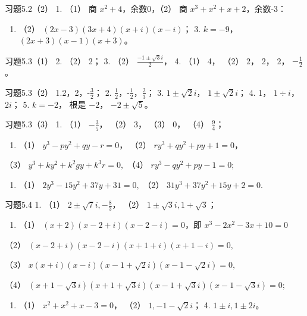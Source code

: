 习题5.2（2） 1. （1） 商 \(x^{2} + 4\)，余数0，（2） 商
\(x^{3} + x^{2} + x + 2\)，余数-3：

\begin{enumerate}[start=2]
\item
  （2） \((2x - 3)(3x + 4)(x + i)(x - i)\)； 3. \(k = -9\)，
  \((2x + 3)(x - 1)(x + 3)\)。
\end{enumerate}

习题5.3（1） 2. （2） 2； 3. （2） \(\frac{-1 \pm \sqrt{3} i}{2}\)， 4.
（1） 4， （2） 2， 2， 2， \(-\frac{1}{2}\)。

习题5.3（2） 1.2，2，-\(\frac{3}{2}\)； 2.
\(\frac{1}{2}\)，-\(\frac{1}{2}\)，\(\frac{2}{3}\)； 3.
\(1 \pm \sqrt{2} i\)， \(1 \pm \sqrt{2} i\)； 4. 1， \(1 \div i\)，
\(2i\)； 5. \(k = -2\)， 根是 \(-2\)， \(-2 \pm \sqrt{5}\)。

习题5.3（3） 1. （1） \(-\frac{3}{5}\)， （2） 3， （3） 0， （4）
\(\frac{9}{4}\)；

\begin{enumerate}[start=2]
\item
  （1） \(y^{3} - py^{2} + qy - r = 0\)， （2）
  \(ry^{3} + qy^{2} + py + 1 = 0\)，
\end{enumerate}

（3） \(y^{3} + ky^{2} + k^{2}gy + k^{3}r = 0,\) （4）
\(ry^{3} - qy^{2} + py - 1 = 0;\)

\begin{enumerate}[start=3]
\item
  （1） \(2y^{3} - 15y^{2} + 37y + 31 = 0,\) （2）
  \(31y^{3} + 37y^{2} + 15y + 2 = 0.\)
\end{enumerate}

习题5.4 1. （1） \(2 \pm \sqrt{7} i, -\frac{8}{3}\)， （2）
\(1 \pm \sqrt{3} i, 1 + \sqrt{3}\)；

\begin{enumerate}[start=2]
\item
  （1） \((x + 2)(x - 2 + i)(x - 2 - i) = 0\)，即
  \(x^3 - 2x^2 - 3x + 10 = 0\)
\end{enumerate}

（2） \((x - 2 + i)(x - 2 - i)(x + 1 + i)(x + 1 - i) = 0,\)

（3） \(x(x + i)(x - i)(x - 1 + \sqrt{2} i)(x - 1 - \sqrt{2} i) = 0,\)

（4）
\((x + 1 - \sqrt{3} i)(x + 1 + \sqrt{3} i)(x - 1 + \sqrt{3} i)(x - 1 - \sqrt{3} i) = 0;\)

\begin{enumerate}[start=3]
\item
  （1） \(x^{2} + x^{2} + x - 3 = 0\)， （2） \(1, -1 - \sqrt{2} i\)；
  4. \(1 \pm i, 1 \pm 2i\)。
\end{enumerate}

